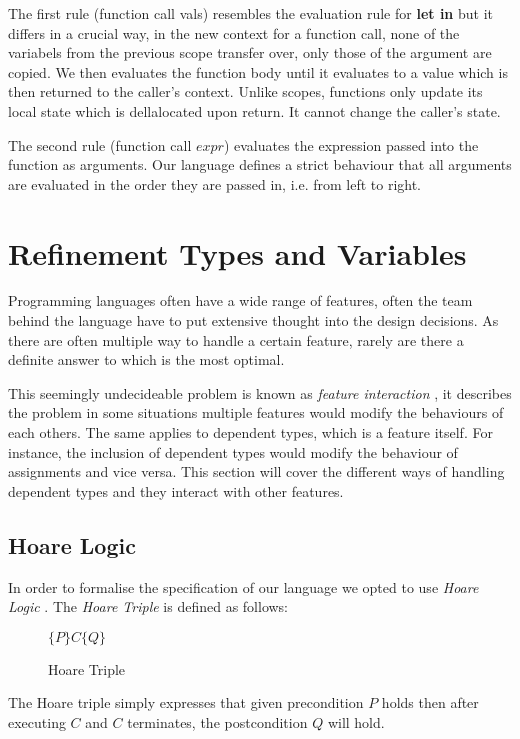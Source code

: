 \documentclass[a4paper,12pt]{report}
\begin{document}
\par
The first rule (function call vals) resembles the evaluation rule for 
\textbf{let in} but it differs in a crucial way, in the new context for a 
function call, none of the variabels from the previous scope transfer over, only 
those of the argument are copied. We then evaluates the function body until it 
evaluates to a value which is then returned to the caller's context. Unlike 
scopes, functions only update its local state which is dellalocated upon return. 
It cannot change the caller's state. 

\par
The second rule (function call $expr$) evaluates the expression passed into the 
function as arguments. Our language defines a strict behaviour that all 
arguments are evaluated in the order they are passed in, i.e. from left to right. 

\section{Refinement Types and Variables}
Programming languages often have a wide range of features, often the team behind 
the language have to put extensive thought into the design decisions. As there 
are often multiple way to handle a certain feature, rarely are there a definite 
answer to which is the most optimal.

\par
This seemingly undecideable problem is known as \textit{feature interaction} 
\cite{featInteract}, it describes the problem in some situations multiple 
features would modify the behaviours of each others. The same applies to 
dependent types, which is a feature itself. For instance, the inclusion of dependent types 
would modify the behaviour of assignments and vice versa. This section 
will cover the different ways of handling dependent types and they interact with 
other features.

\subsection{Hoare Logic}
In order to formalise the specification of our language we opted to use 
\textit{Hoare Logic} \cite{hoare}. The \textit{Hoare Triple} is defined as follows: 

\begin{figure}[H]
  \begin{center}
    $\{P\}C\{Q\}$
  \end{center}
  \caption{Hoare Triple}
\end{figure}
The Hoare triple simply expresses that given precondition $P$ holds then after executing $C$ 
and $C$ terminates, the postcondition $Q$ will hold.
\end{document}
